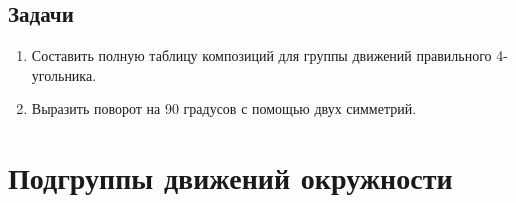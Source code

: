 \subsection*{Задачи}
\begin{enumerate}
\item Составить полную таблицу композиций для группы движений правильного 4-угольника.
\item Выразить поворот на 90 градусов с помощью двух симметрий.
\end{enumerate}


\section{Подгруппы движений окружности}


